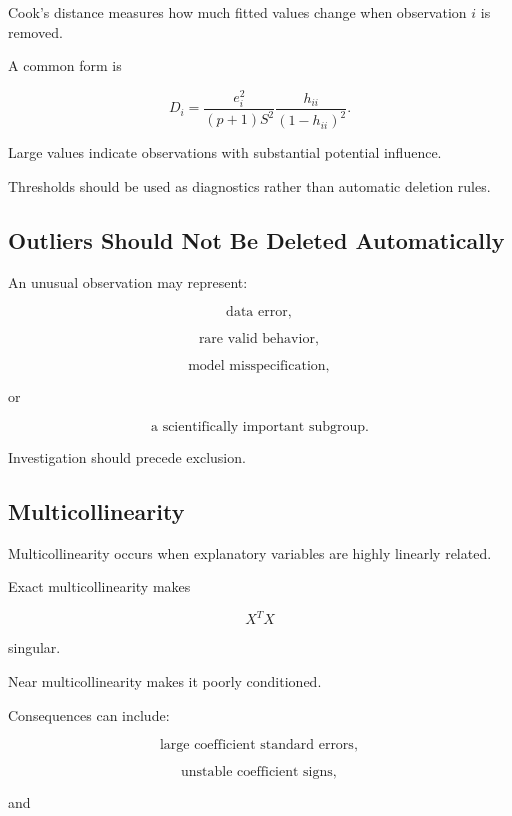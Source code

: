 Cook's distance measures how much fitted values change when observation
\(i\) is removed.

A common form is

\[
\boxed{
D_i
=
\frac{
e_i^2
}{
(p+1)S^2
}
\frac{
h_{ii}
}{
(1-h_{ii})^2
}.
}
\]

Large values indicate observations with substantial potential influence.

Thresholds should be used as diagnostics rather than automatic deletion
rules.

\subsection{Outliers Should Not Be Deleted Automatically}
\label{subsec:outlier-deletion-regression}

An unusual observation may represent:

\[
\boxed{
\text{data error},
}
\]

\[
\boxed{
\text{rare valid behavior},
}
\]

\[
\boxed{
\text{model misspecification},
}
\]

or

\[
\boxed{
\text{a scientifically important subgroup}.
}
\]

Investigation should precede exclusion.

\subsection{Multicollinearity}
\label{subsec:multicollinearity}

Multicollinearity occurs when explanatory variables are highly linearly
related.

Exact multicollinearity makes

\[
X^TX
\]

singular.

Near multicollinearity makes it poorly conditioned.

Consequences can include:

\[
\boxed{
\text{large coefficient standard errors},
}
\]

\[
\boxed{
\text{unstable coefficient signs},
}
\]

and

